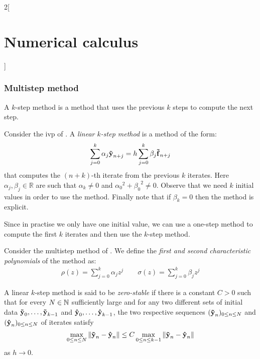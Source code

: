\documentclass[../../../main_math.tex]{subfiles}
\begin{document}
\begin{multicols}{2}[\section{Numerical calculus}]
  \subsubsection{Multistep method}
  \begin{definition}
    A $k$-step method is a method that uses the previous $k$ steps to compute the next step.
  \end{definition}
  \begin{definition}
    Consider the ivp of . A \emph{linear $k$-step method} is a method of the form:
    \begin{equation}\label{NC:multistep}
      \sum_{j=0}^k\alpha_j\boldsymbol{\mathrm{\tilde{y}}}_{n+j}=h\sum_{j=0}^{k}\beta_j\boldsymbol{\mathrm{\tilde{f}}}_{n+j}
    \end{equation}
    that computes the $(n+k)$-th iterate from the previous $k$ iterates. Here $\alpha_j,\beta_j\in\mathbb{R}$ are such that $\alpha_k\ne 0$ and ${\alpha_0}^2+{\beta_0}^2\ne 0$. Observe that we need $k$ initial values in order to use the method. Finally note that if $\beta_k=0$ then the method is explicit.
  \end{definition}
  \begin{remark}
    Since in practise we only have one initial value, we can use a one-step method to compute the first $k$ iterates and then use the $k$-step method.
  \end{remark}
  \begin{definition}
    Consider the multistep method of . We define the \emph{first and second characteristic polynomials} of the method as:
    \begin{gather*}
      \rho(z) =\sum_{j=0}^k\alpha_jz^j                  \qquad
      \sigma (z) =\sum_{j=0}^k\beta_jz^j
    \end{gather*}
  \end{definition}
  \begin{definition}
    A linear $k$-step method is said to be \emph{zero-stable} if there is a constant $C>0$ such that for every $N\in\mathbb{N}$ sufficiently large and for any two different sets of initial data $\boldsymbol{\mathrm{\tilde{y}}}_0,\ldots,\boldsymbol{\mathrm{\tilde{y}}}_{k-1}$ and $\boldsymbol{\mathrm{\hat{y}}}_0,\ldots,\boldsymbol{\mathrm{\hat{y}}}_{k-1}$, the two respective sequences $(\boldsymbol{\mathrm{\tilde{y}}}_n)_{0\leq n\leq N}$ and $(\boldsymbol{\mathrm{\hat{y}}}_n)_{0\leq n\leq N}$ of iterates satisfy
    $$\max_{0\leq n\leq N}\left\|\boldsymbol{\mathrm{\tilde{y}}}_n-\boldsymbol{\mathrm{\hat{y}}}_n\right\|\leq C\max_{0\leq n\leq k-1}\left\|\boldsymbol{\mathrm{\tilde{y}}}_n-\boldsymbol{\mathrm{\hat{y}}}_n\right\|$$
    as $h\to 0$.
  \end{definition}

\end{multicols}
\end{document}

